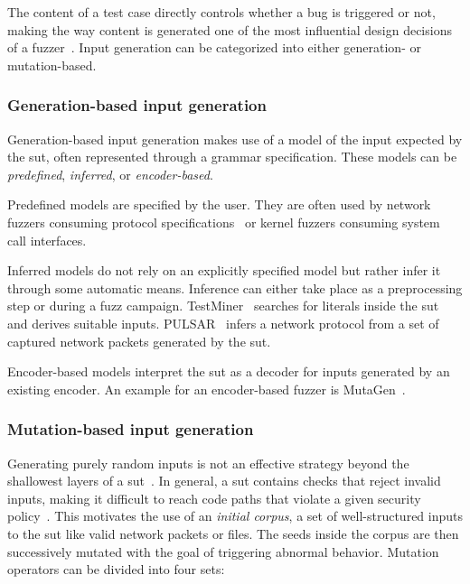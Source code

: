 
The content of a test case directly controls whether a bug is triggered or not, making
the way content is generated one of the most influential design decisions of a fuzzer~\cite{manes_art_2019}.
Input generation can be categorized into either generation- or mutation-based.

\subsubsection{Generation-based input generation}

Generation-based input generation makes use of a model of the input expected by
the \gls{sut}, often represented through a grammar specification.
These models can be \emph{predefined}, \emph{inferred}, or \emph{encoder-based}.

Predefined models are specified by the user.
They are often used by network fuzzers consuming protocol
specifications~\cite{pereyda_boofuzz_nodate} or kernel fuzzers consuming system
call interfaces.

Inferred models do not rely on an explicitly specified model but rather infer it through some automatic means.
Inference can either take place as a preprocessing step or during a fuzz campaign.
TestMiner~\cite{toffola_saying_2017} searches for literals inside the \gls{sut} and derives suitable inputs.
PULSAR~\cite{thuraisingham_pulsar_2015} infers a network protocol from a set of captured network packets generated by the \gls{sut}.

Encoder-based models interpret the \gls{sut} as a decoder for inputs generated by an existing encoder.
An example for an encoder-based fuzzer is MutaGen~\cite{kargen_turning_2015}.

\subsubsection{Mutation-based input generation}

Generating purely random inputs is not an effective strategy beyond the
shallowest layers of a \gls{sut}~\cite{manes_art_2019,godefroid_sage_2012}.
In general, a \gls{sut} contains checks that reject invalid inputs, making it
difficult to reach code paths that violate a given security policy~\cite{manes_art_2019}.
This motivates the use of an \emph{initial corpus}, a set of well-structured inputs
to the \gls{sut} like valid network packets or files.
The seeds inside the corpus are then successively mutated with the goal
of triggering abnormal behavior.
Mutation operators can be divided into four sets:

